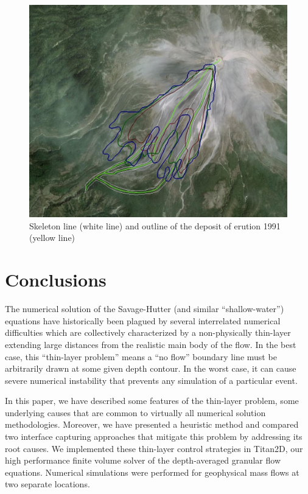 \documentclass[letterpaper,10pt]{article}
\begin{document}
 \begin{figure}[H]
 \centerline{\includegraphics[scale=0.5]{IMAGES/comparison1.jpg}}
 \caption{Skeleton line (white line) and outline of the deposit of erution 1991 (yellow line)}
 \label{compfig}
 \end{figure}



\section{Conclusions} \label{conclusions}
The numerical solution of the Savage-Hutter (and similar 
``shallow-water'') equations have historically been plagued by 
several interrelated numerical difficulties which are collectively 
characterized by a non-physically thin-layer extending 
large distances from the realistic main body of the flow. In the 
best case, this ``thin-layer problem'' means a ``no flow'' boundary 
line must be arbitrarily drawn at some given depth contour.  In 
the worst case, it can cause severe numerical instability that 
prevents any simulation of a particular event.

In this paper, we 
have described some features of the thin-layer problem,
some underlying causes that are common to virtually all numerical 
solution methodologies.  Moreover, we have presented a heuristic method and compared 
two interface capturing approaches that 
mitigate this problem by addressing its root causes.  We 
implemented these thin-layer control strategies in Titan2D, our high 
performance finite volume solver of the depth-averaged granular 
flow equations.  Numerical simulations were performed for 
geophysical mass flows at two separate locations.
\end{document}

